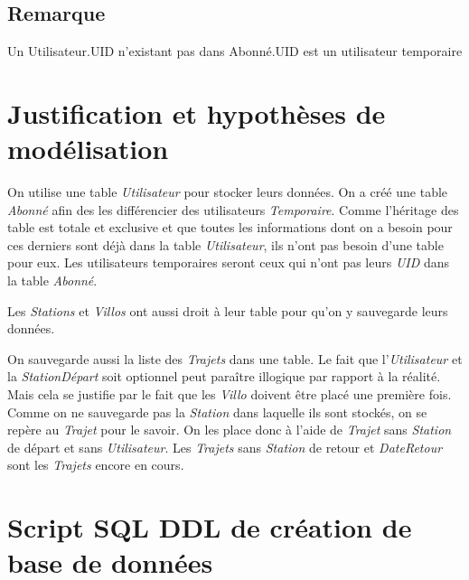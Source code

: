\documentclass[a4paper, 12pt]{report}
\begin{document}
	\subsection*{Remarque}
	Un Utilisateur.UID n'existant pas dans Abonné.UID est un utilisateur temporaire

\section*{Justification et hypothèses de modélisation} %

On utilise une table \textit{Utilisateur} pour stocker leurs données. On a créé une table \textit{Abonné} afin des les différencier des utilisateurs \textit{Temporaire}. Comme l'héritage des table est totale et exclusive et que toutes les informations dont on a besoin pour ces derniers sont déjà dans la table \textit{Utilisateur}, ils n'ont pas besoin d'une table pour eux. Les utilisateurs temporaires seront ceux qui n'ont pas leurs \textit{UID} dans la table \textit{Abonné}.

Les \textit{Stations} et \textit{Villos} ont aussi droit à leur table pour qu'on y sauvegarde leurs données.

On sauvegarde aussi la liste des \textit{Trajets} dans une table. Le fait que l'\textit{Utilisateur} et la \textit{StationDépart} soit optionnel peut paraître illogique par rapport à la réalité. Mais cela se justifie par le fait que les \textit{Villo} doivent être placé une première fois. Comme on ne sauvegarde pas la \textit{Station} dans laquelle ils sont stockés, on se repère au \textit{Trajet} pour le savoir. On les place donc à l'aide de \textit{Trajet} sans \textit{Station} de départ et sans \textit{Utilisateur}. Les \textit{Trajets} sans \textit{Station} de retour et \textit{DateRetour} sont les \textit{Trajets} encore en cours.

\section*{Script SQL DDL de création de base de données}

\lstset {numbers=left ,numberstyle=\tiny \bfseries \underline , stepnumber=1,firstnumber=1,numberfirstline=true}
\end{document}
